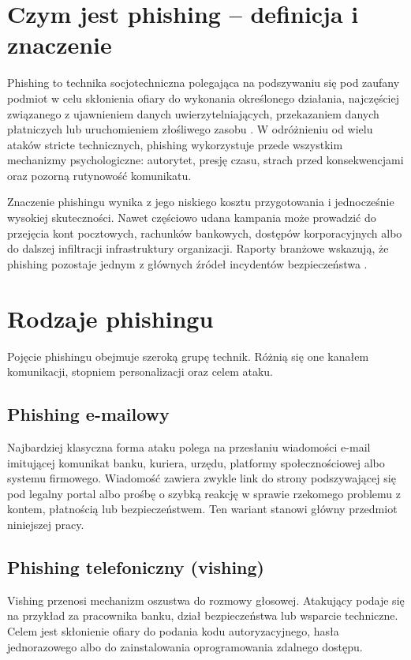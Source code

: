 \documentclass[12pt,a4paper,openany]{report}
\begin{document}
\section{Czym jest phishing -- definicja i znaczenie}

Phishing to technika socjotechniczna polegająca na podszywaniu się pod zaufany podmiot w celu skłonienia ofiary do wykonania określonego działania, najczęściej związanego z ujawnieniem danych uwierzytelniających, przekazaniem danych płatniczych lub uruchomieniem złośliwego zasobu \cite{jagatic2007social}. W odróżnieniu od wielu ataków stricte technicznych, phishing wykorzystuje przede wszystkim mechanizmy psychologiczne: autorytet, presję czasu, strach przed konsekwencjami oraz pozorną rutynowość komunikatu.

Znaczenie phishingu wynika z jego niskiego kosztu przygotowania i jednocześnie wysokiej skuteczności. Nawet częściowo udana kampania może prowadzić do przejęcia kont pocztowych, rachunków bankowych, dostępów korporacyjnych albo do dalszej infiltracji infrastruktury organizacji. Raporty branżowe wskazują, że phishing pozostaje jednym z głównych źródeł incydentów bezpieczeństwa \cite{apwg2023,kaspersky2024}.

\section{Rodzaje phishingu}

Pojęcie phishingu obejmuje szeroką grupę technik. Różnią się one kanałem komunikacji, stopniem personalizacji oraz celem ataku.

\subsection{Phishing e-mailowy}

Najbardziej klasyczna forma ataku polega na przesłaniu wiadomości e-mail imitującej komunikat banku, kuriera, urzędu, platformy społecznościowej albo systemu firmowego. Wiadomość zawiera zwykle link do strony podszywającej się pod legalny portal albo prośbę o szybką reakcję w sprawie rzekomego problemu z kontem, płatnością lub bezpieczeństwem. Ten wariant stanowi główny przedmiot niniejszej pracy.

\subsection{Phishing telefoniczny (vishing)}

Vishing przenosi mechanizm oszustwa do rozmowy głosowej. Atakujący podaje się na przykład za pracownika banku, dział bezpieczeństwa lub wsparcie techniczne. Celem jest skłonienie ofiary do podania kodu autoryzacyjnego, hasła jednorazowego albo do zainstalowania oprogramowania zdalnego dostępu.
\end{document}
